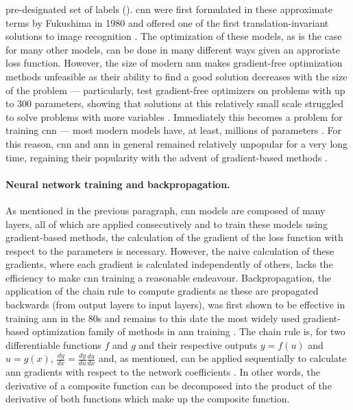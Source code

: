 pre-designated set of labels (). \ac{cnn} were first formulated in these approximate terms by Fukushima in 1980 and offered one of the first translation-invariant solutions to image recognition \cite{Fukushima1980-bk}. The optimization of these models, as is the case for many other models, can be done in many different ways given an approriate loss function. However, the size of modern \ac{ann} makes gradient-free optimization methods unfeasible as their ability to find a good solution decreases with the size of the problem --- particularly,  test gradient-free optimizers on problems with up to 300 parameters, showing that solutions at this relatively small scale struggled to solve problems with more variables \cite{Rios2013-bx}. Immediately this becomes a problem for training \ac{cnn} --- most modern models have, at least, millions of parameters \cite{Li2021-xu}. For this reason, \ac{cnn} and \ac{ann} in general remained relatively unpopular for a very long time, regaining their popularity with the advent of gradient-based methods \cite{Kurenkov_undated-pu}.

\begin{figure}
	\label{fig:cnn}
\end{figure}

\paragraph{Neural network training and backpropagation.} As mentioned in the previous paragraph, \ac{cnn} models are composed of many layers, all of which are applied consecutively and to train these models using gradient-based methods, the calculation of the gradient of the loss function with respect to the parameters is necessary. However, the naive calculation of these gradients, where each gradient is calculated independently of others, lacks the efficiency to make \ac{cnn} training a reasonable endeavour. Backpropagation, the application of the chain rule to compute gradients as these are propagated backwards (from output layers to input layers), was first shown to be effective in training \ac{ann} in the 80s and remains to this date the most widely used gradient-based optimization family of methods in \ac{ann} training \cite{Rumelhart1986-tl,LeCun1989-ro}. The chain rule is, for two differentiable functions $f$ and $g$ and their respective outputs $y = f(u)$ and $u = g(x)$, $\frac{dy}{dx} = \frac{dy}{du}\frac{du}{dx}$ and, as mentioned, can be applied sequentially to calculate \ac{ann} gradients with respect to the network coefficients \cite{Rumelhart1986-tl}. In other words, the derivative of a composite function can be decomposed into the product of the derivative of both functions which make up the composite function. 

